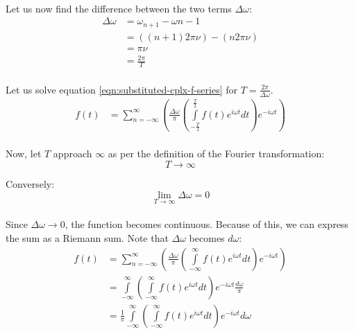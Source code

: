 \documentclass{article}
\begin{document}
\paragraph*{}
Let us now find the difference between the two terms $\Delta \omega$:
\begin{equation*}
	\begin{aligned}
		\Delta \omega &= \omega_{n+1} - \omega{n-1} \\
		&= ((n + 1)2 \pi \nu) - (n 2 \pi \nu) \\
		&= \pi \nu \\
		&= \frac{2 \pi}{T}
	\end{aligned}
\end{equation*}

\paragraph*{}
Let us solve equation \ref{eqn:substituted-cplx-f-series} for $T = \frac{2 \pi}
{\Delta \omega}$.
\begin{equation*}
	\begin{aligned}
		f(t) &= \sum_{n = - \infty}^{\infty} \left( \frac{\Delta
			\omega}{\pi} \left(
	\int\limits_{-\frac{T}{2}}^{\frac{T}{2}} f(t) e^{i \omega t} dt\right)e^{-i \omega
	t} \right)
	\end{aligned}
\end{equation*}

\paragraph*{}
Now, let $T$ approach $\infty$ as per the definition of the Fourier
transformation:
$$T \rightarrow \infty$$

Conversely:
$$\lim_{T \rightarrow \infty} \Delta \omega = 0$$

\paragraph*{}
Since $\Delta \omega \rightarrow 0$, the function becomes continuous. Because
of this, we can express the sum as a Riemann sum. Note that $\Delta \omega$
becomes $d \omega$:
\begin{equation}
	\begin{aligned}
		f(t) &= \sum_{n = - \infty}^{\infty} \left( \frac{\Delta \omega}{\pi}
		\left( \int\limits_{-\infty}^{\infty} f(t) e^{i \omega t}
		dt\right)e^{-i \omega t} \right) \\
		&= \int\limits_{- \infty}^{\infty} \left(
		\int\limits_{-\infty}^{\infty} f(t) e^{i \omega t} dt\right)e^{-i
		\omega t} \frac{d \omega}{\pi} \\
		&= \frac{1}{\pi} \int\limits_{- \infty}^{\infty} \left(
		\int\limits_{-\infty}^{\infty} f(t) e^{i \omega t} dt\right)e^{-i
		\omega t} d \omega
	\end{aligned}
	\label{eqn:riemann-fourier}
\end{equation}
\end{document}
